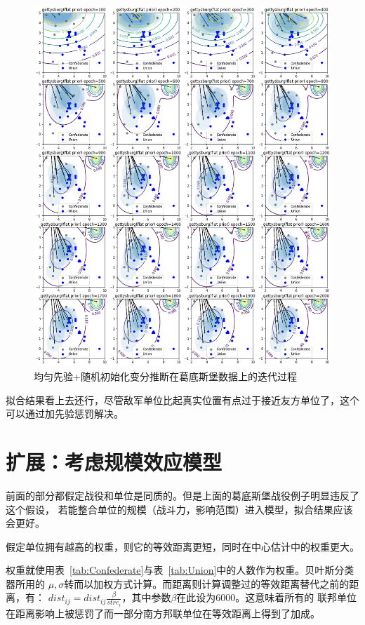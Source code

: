 \documentclass{article}
\begin{document}
\begin{figure}[ht]
\includegraphics[width=0.99\linewidth]{gettysburg-init.png}
\caption{
均匀先验+随机初始化变分推断在葛底斯堡数据上的迭代过程}
\label{fig:gettysburgInit}
\end{figure}


拟合结果看上去还行，尽管敌军单位比起真实位置有点过于接近友方单位了，这个可以通过加先验惩罚解决。


\section{扩展：考虑规模效应模型}


前面的部分都假定战役和单位是同质的。但是上面的葛底斯堡战役例子明显违反了这个假设，
若能整合单位的规模（战斗力，影响范围）进入模型，拟合结果应该会更好。

假定单位拥有越高的权重，则它的等效距离更短，同时在中心估计中的权重更大。

权重就使用表~\ref{tab:Confederate}与表~\ref{tab:Union}中的人数作为权重。贝叶斯分类器所用的
$\mu,\sigma$转而以加权方式计算。而距离则计算调整过的等效距离替代之前的距离，有：
$dist_{ij} = dist_{ij} \frac{\beta}{stre_i}$，其中参数$\beta$在此设为$6000$。这意味着所有的
联邦单位在距离影响上被惩罚了而一部分南方邦联单位在等效距离上得到了加成。
\end{document}
